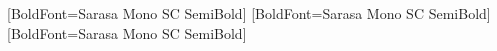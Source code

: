 \ExplSyntaxOff
{}[BoldFont={Sarasa Mono SC SemiBold}]
[BoldFont={Sarasa Mono SC SemiBold}]
[BoldFont={Sarasa Mono SC SemiBold}]
\ExplSyntaxOn

